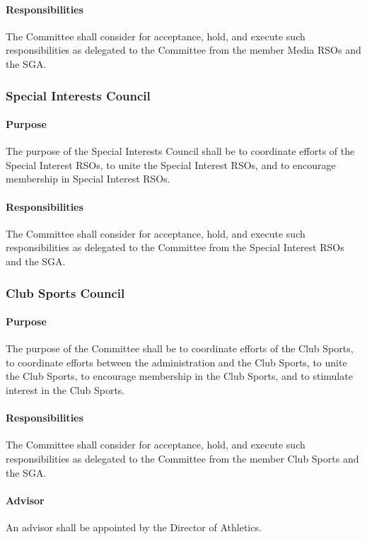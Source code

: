 \documentclass[12pt]{scrreprt}
\begin{document}
\paragraph{Responsibilities}
The Committee shall consider for acceptance, hold, and execute such
responsibilities as delegated to the Committee from the member Media RSOs and 
the SGA.

\subsubsection{Special Interests Council}

\paragraph{Purpose}
The purpose of the Special Interests Council shall be to coordinate efforts of 
the Special Interest RSOs, to unite the Special Interest RSOs, and to 
encourage membership in Special Interest RSOs.

\paragraph{Responsibilities}
The Committee shall consider for acceptance, hold, and execute such 
responsibilities as delegated to the Committee from the Special Interest RSOs 
and the SGA.

\subsubsection{Club Sports Council}

\paragraph{Purpose}
The purpose of the Committee shall be to coordinate efforts of the Club 
Sports, to coordinate efforts between the administration and the Club Sports, 
to unite the Club Sports, to encourage membership in the Club Sports, and to 
stimulate interest in the Club Sports.

\paragraph{Responsibilities}
The Committee shall consider for acceptance, hold, and execute such 
responsibilities as delegated to the Committee from the member Club Sports and 
the SGA.

\paragraph{Advisor}
An advisor shall be appointed by the Director of Athletics.
\end{document}
